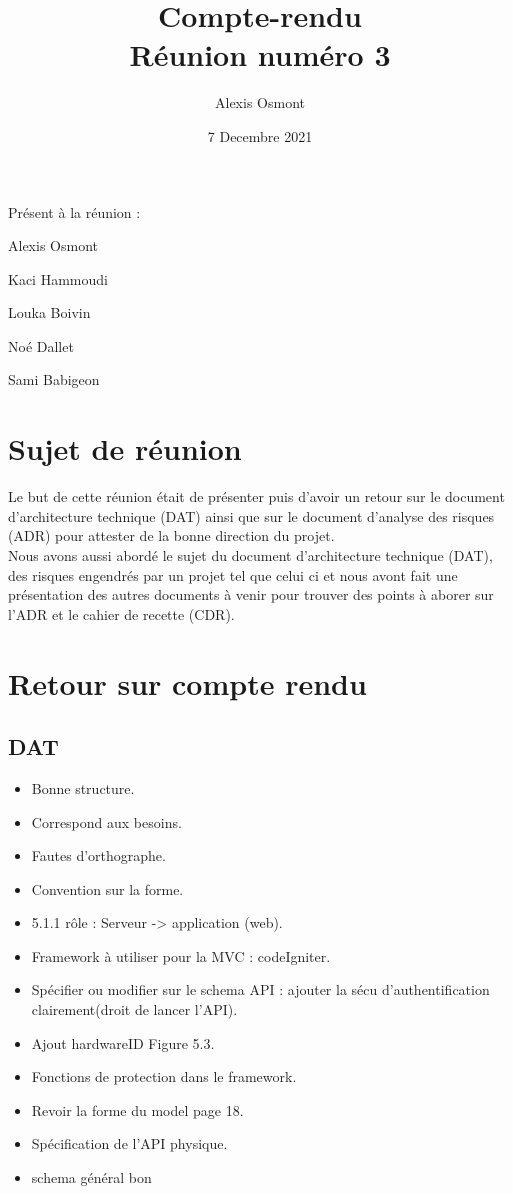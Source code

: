 \documentclass{article}
\title{
    \Huge
    Compte-rendu\\
    Réunion numéro 3\\
}
\date{\huge 7 Decembre 2021}
\author{\huge Alexis Osmont\\}
\begin{document}
\maketitle
\vspace{5cm}
    Présent à la réunion :
    \begin{description}
        \item Alexis Osmont
        \item Kaci Hammoudi
        \item Louka  Boivin
        \item Noé Dallet
        \item Sami Babigeon
    \end{description}
\newpage

\section{Sujet de réunion}   

Le but de cette réunion était de présenter puis d'avoir un retour sur le document d'architecture technique (DAT) ainsi que sur le document d'analyse des risques (ADR) pour attester de la bonne direction du projet.\\

Nous avons aussi abordé le sujet du document d'architecture technique (DAT), des risques engendrés par un projet tel que celui ci et nous avont fait une présentation des autres documents à venir 
pour trouver des points à aborer sur l'ADR et le cahier de recette (CDR).
\vspace{0.5cm}

\section{Retour sur compte rendu}
\subsection{DAT}

\begin{itemize}
    \item Bonne structure. 
    \item Correspond aux besoins.
    \item Fautes d'orthographe.
    \item Convention sur la forme.
    \item 5.1.1 rôle : Serveur -> application (web).
    \item Framework à utiliser pour la MVC : codeIgniter.
    \item Spécifier ou modifier sur le schema API : ajouter la sécu d'authentification clairement(droit de lancer l'API).
    \item Ajout hardwareID Figure 5.3.
    \item Fonctions de protection dans le framework.
    \item Revoir la forme du model page 18.
    \item Spécification de l'API physique. 
    \item schema général bon
\end{itemize}
\end{document}
